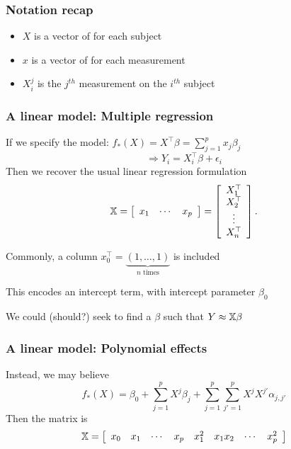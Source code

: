 \documentclass{beamer}
\begin{document}
\begin{frame}
\frametitle{Notation recap}
\begin{itemize}
\item $X$ is a vector of  for each subject

\item $x$ is a vector of  for each measurement

\item $X_i^j$ is the $j^{th}$ measurement on the $i^{th}$ subject

\end{itemize}
\end{frame}





\begin{frame}
\frametitle{A linear model: Multiple regression}
If we specify the model: $f_*(X) = X^{\top}\beta =  \sum_{j=1}^p x_j \beta_j$ 
\[
\Rightarrow Y_i = X_i^{\top}\beta + \epsilon_i
\] 
 Then we recover the usual linear regression formulation
\[
\mathbb{X} = 
\left[
\begin{array}{ccc}
x_1 & \cdots & x_p 
\end{array}
\right]
=
\left[
\begin{array}{cccc}
X_{1}^{\top} \\
X_{2}^{\top} \\
\vdots    \\
X_{n}^{\top} \\
\end{array}
\right].
\]
\vsp

Commonly, a column $x_0^{\top} = \underbrace{(1,\ldots,1)}_{n \textrm{ times}}$ is included

This encodes an intercept term, with intercept parameter $\beta_0$ 

\vsp

We could (should?) seek to find a $\beta$ such that $Y \approx \mathbb{X}\beta$

\end{frame}

\begin{frame}
\frametitle{A linear model: Polynomial effects}
Instead, we may believe 
\[
f_*(X) = \beta_0 + \sum_{j=1}^p X^j \beta_j + \sum_{j=1}^p \sum_{j'=1}^p X^jX^{j'} \alpha_{j,j'}
\]
 Then the  matrix is
\[
\mathbb{X} = 
\left[
\begin{array}{cccccccc}
x_0 & x_1 & \cdots & x_p & x_1^2 & x_1x_2 & \cdots & x_p^2
\end{array}
\right]
\]

\end{frame}
\end{document}

